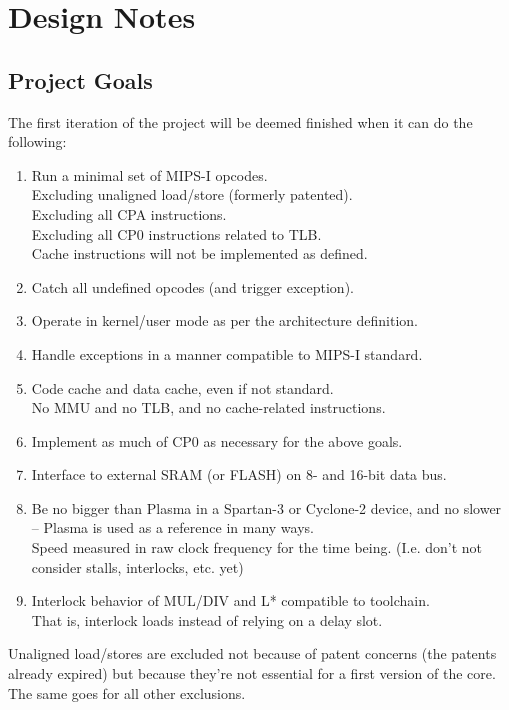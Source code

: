 \chapter{Design Notes}
\label{notes}

\section{Project Goals}
\label{goals}

    The first iteration of the project will be deemed finished when it can do
    the following:

\begin{enumerate}
    \item Run a minimal set of MIPS-I opcodes.\\
        Excluding unaligned load/store (formerly patented).\\
        Excluding all CPA instructions.\\
        Excluding all CP0 instructions related to TLB.\\
        Cache instructions will not be implemented as defined.
    \item Catch all undefined opcodes (and trigger exception).
    \item Operate in kernel/user mode as per the architecture definition.
    \item Handle exceptions in a manner compatible to MIPS-I standard.
    \item Code cache and data cache, even if not standard.\\
        No MMU and no TLB, and no cache-related instructions.
    \item Implement as much of CP0 as necessary for the above goals.
    \item Interface to external SRAM (or FLASH) on 8- and 16-bit data bus.
    \item Be no bigger than Plasma in a Spartan-3 or Cyclone-2 device, and
        no slower -- Plasma is used as a reference in many ways.\\
        Speed measured in raw clock frequency for the time being.
        (I.e. don't not consider stalls, interlocks, etc. yet)
    \item Interlock behavior of MUL/DIV and L* compatible to toolchain.\\
        That is, interlock loads instead of relying on a delay slot.
\end{enumerate}


    Unaligned load/stores are excluded not because of patent concerns (the
    patents already expired) but because they're not essential for a first
    version of the core. The same goes for all other exclusions.


